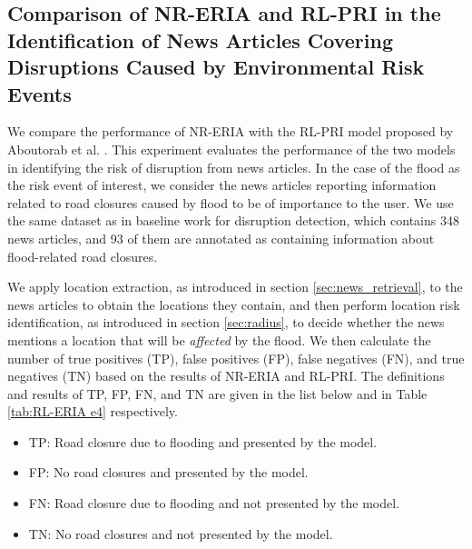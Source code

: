 \documentclass[]{ceurart}
\begin{document}
\subsection{Comparison of NR-ERIA and RL-PRI in the Identification of News Articles Covering Disruptions Caused by Environmental Risk Events}

We compare the performance of NR-ERIA with the RL-PRI model proposed by Aboutorab et al. \cite{aboutorab2021reinforcement}. This experiment evaluates the performance of the two models in identifying the risk of disruption from news articles. In the case of the flood as the risk event of interest, we consider the news articles reporting information related to road closures caused by flood to be of importance to the user. 
We use the same dataset as in baseline work \cite{aboutorab2021reinforcement} for disruption detection, which contains 348 news articles, and 93 of them are annotated as containing information about flood-related road closures. 

We apply location extraction, as introduced in section \ref{sec:news_retrieval}, to the news articles to obtain the locations they contain, and then perform location risk identification, as introduced in section \ref{sec:radius}, to decide whether the news mentions a location that will be \textit{affected} by the flood. 
We then calculate the number of true positives (TP), false positives (FP), false negatives (FN), and true negatives (TN) based on the results of NR-ERIA and RL-PRI. The definitions and results of TP, FP, FN, and TN are given in the list below and in Table \ref{tab:RL-ERIA e4} respectively.

\begin{itemize}
    \item TP: Road closure due to flooding and presented by the model.
    \item FP: No road closures and presented by the model.
    \item FN: Road closure due to flooding and not presented by the model.
    \item TN: No road closures and not presented by the model.
\end{itemize}

\begin{table}[h]
\caption{TPs, FPs, FNs, and TNs of NR-ERIA and RL-PRI.}
\label{tab:RL-ERIA e4}
  \centering
\end{table}
\end{document}
